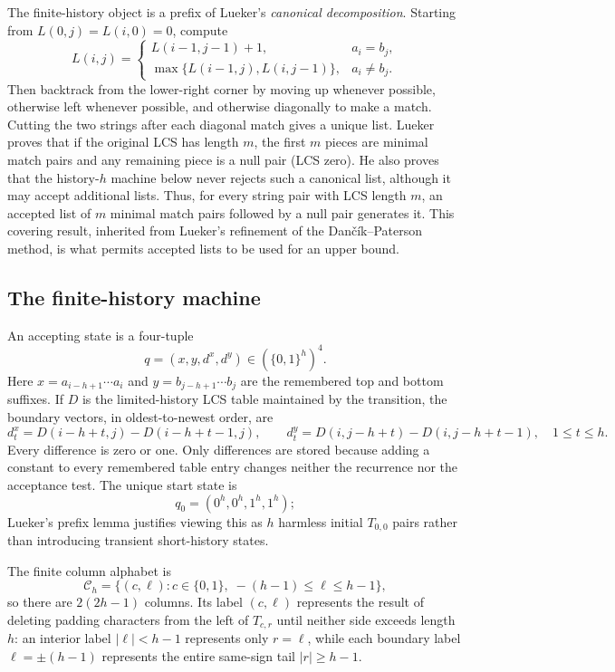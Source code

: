 \documentclass[11pt]{article}
\theoremstyle{plain}
\begin{document}
The finite-history object is a prefix of Lueker's \emph{canonical decomposition}. Starting from $L(0,j)=L(i,0)=0$, compute
\[
 L(i,j)=
 \begin{cases}
   L(i-1,j-1)+1,&a_i=b_j,\\
   \max\{L(i-1,j),L(i,j-1)\},&a_i\ne b_j.
 \end{cases}
\]
Then backtrack from the lower-right corner by moving up whenever possible, otherwise left whenever possible, and otherwise diagonally to make a match. Cutting the two strings after each diagonal match gives a unique list. Lueker proves that if the original LCS has length $m$, the first $m$ pieces are minimal match pairs and any remaining piece is a null pair (LCS zero). He also proves that the history-$h$ machine below never rejects such a canonical list, although it may accept additional lists. Thus, for every string pair with LCS length $m$, an accepted list of $m$ minimal match pairs followed by a null pair generates it. This covering result, inherited from Lueker's refinement of the Dan\v{c}\'ik--Paterson method, is what permits accepted lists to be used for an upper bound.

\subsection{The finite-history machine}

An accepting state is a four-tuple
\[
 q=(x,y,d^x,d^y)\in(\{0,1\}^h)^4.
\]
Here $x=a_{i-h+1}\cdots a_i$ and $y=b_{j-h+1}\cdots b_j$ are the remembered top and bottom suffixes. If $D$ is the limited-history LCS table maintained by the transition, the boundary vectors, in oldest-to-newest order, are
\[
 d^x_t=D(i-h+t,j)-D(i-h+t-1,j),\qquad
 d^y_t=D(i,j-h+t)-D(i,j-h+t-1),\quad 1\leq t\leq h.
\]
Every difference is zero or one. Only differences are stored because adding a constant to every remembered table entry changes neither the recurrence nor the acceptance test. The unique start state is
\[
 q_0=(0^h,0^h,1^h,1^h);
\]
Lueker's prefix lemma justifies viewing this as $h$ harmless initial $T_{0,0}$ pairs rather than introducing transient short-history states.

The finite column alphabet is
\[
 \mathcal C_h=\{(c,\ell):c\in\{0,1\},\;-(h-1)\leq\ell\leq h-1\},
\]
so there are $2(2h-1)$ columns. Its label $(c,\ell)$ represents the result of deleting padding characters from the left of $T_{c,r}$ until neither side exceeds length $h$: an interior label $|\ell|<h-1$ represents only $r=\ell$, while each boundary label $\ell=\pm(h-1)$ represents the entire same-sign tail $|r|\geq h-1$.
\end{document}
